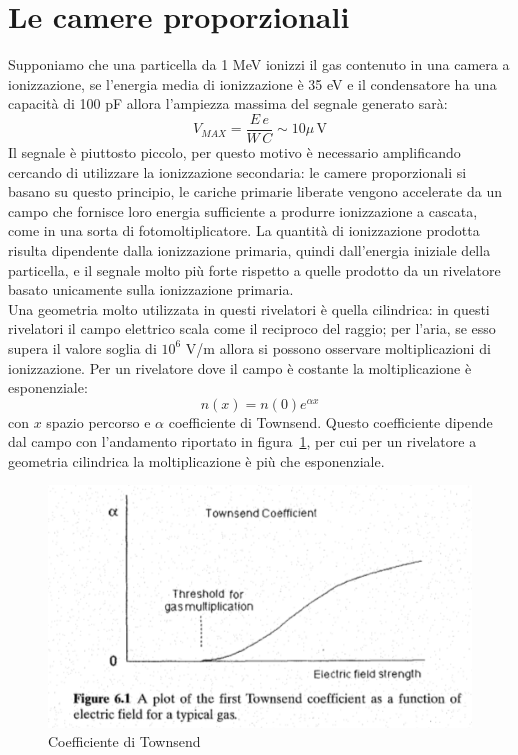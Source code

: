 \section{Le camere proporzionali}
Supponiamo che una particella da 1 MeV ionizzi il gas contenuto in una camera a ionizzazione, se l'energia media di ionizzazione \`e 35 eV e il condensatore
ha una capacit\`a di 100 pF allora l'ampiezza massima del segnale generato sar\`a:
\begin{equation*}
V_{MAX} = \frac{E\,e}{W \, C} \sim 10 \mu\,\text{V}
\end{equation*}
Il segnale \`e piuttosto piccolo, per questo motivo \`e necessario amplificando cercando di utilizzare la ionizzazione secondaria:
le camere proporzionali si basano su questo principio, le cariche primarie liberate vengono accelerate da un campo che fornisce loro energia sufficiente
a produrre ionizzazione a cascata, come in una sorta di fotomoltiplicatore.
La quantit\`a di ionizzazione prodotta risulta dipendente dalla ionizzazione primaria, quindi dall'energia iniziale della particella, e il segnale
molto pi\`u forte rispetto a quelle prodotto da un rivelatore basato unicamente sulla ionizzazione primaria.\\
Una geometria molto utilizzata in questi rivelatori \`e quella cilindrica: in questi rivelatori il campo elettrico scala come il reciproco del raggio;
per l'aria, se esso supera il valore soglia di $10^6$ V/m allora si possono osservare moltiplicazioni di ionizzazione.
Per un rivelatore dove il campo \`e costante la moltiplicazione \`e esponenziale:
\begin{equation*}
n(x) = n(0) e^{\alpha x}
\end{equation*}
con $x$ spazio percorso e $\alpha$ coefficiente di Townsend.
Questo coefficiente dipende dal campo con l'andamento riportato in figura~\ref{fig:townsend}, per cui per un rivelatore a geometria cilindrica
la moltiplicazione \`e pi\`u che esponenziale.
\begin{figure}[htbp]
\begin{center}
	\includegraphics[scale=0.8]{./Immagini/Townsend.png}
\caption{Coefficiente di Townsend}
\label{fig:townsend}
\end{center}
\end{figure}
